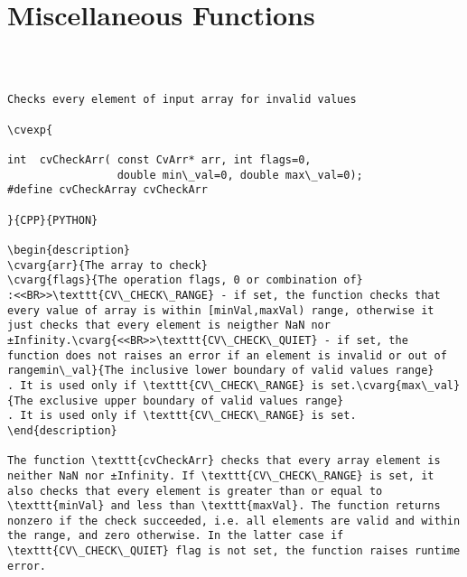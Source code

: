 \section{Miscellaneous Functions}
\begin{verbatim}


\end{verbatim}
\begin{verbatim}

Checks every element of input array for invalid values

\cvexp{

int  cvCheckArr( const CvArr* arr, int flags=0,
                 double min\_val=0, double max\_val=0);
#define cvCheckArray cvCheckArr

}{CPP}{PYTHON}

\begin{description}
\cvarg{arr}{The array to check}
\cvarg{flags}{The operation flags, 0 or combination of}
:<<BR>>\texttt{CV\_CHECK\_RANGE} - if set, the function checks that every value of array is within [minVal,maxVal) range, otherwise it just checks that every element is neigther NaN nor ±Infinity.\cvarg{<<BR>>\texttt{CV\_CHECK\_QUIET} - if set, the function does not raises an error if an element is invalid or out of rangemin\_val}{The inclusive lower boundary of valid values range}
. It is used only if \texttt{CV\_CHECK\_RANGE} is set.\cvarg{max\_val}{The exclusive upper boundary of valid values range}
. It is used only if \texttt{CV\_CHECK\_RANGE} is set.
\end{description}

The function \texttt{cvCheckArr} checks that every array element is neither NaN nor ±Infinity. If \texttt{CV\_CHECK\_RANGE} is set, it also checks that every element is greater than or equal to \texttt{minVal} and less than \texttt{maxVal}. The function returns nonzero if the check succeeded, i.e. all elements are valid and within the range, and zero otherwise. In the latter case if \texttt{CV\_CHECK\_QUIET} flag is not set, the function raises runtime error.


\end{verbatim}
